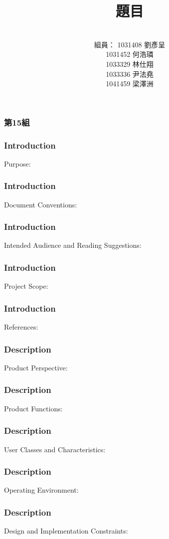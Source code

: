 \documentclass[utf8x]{beamer}
\title[Short title]{\Huge 題目} %
\author{\\  \hspace{-3em}組員： 1031408 劉彥呈 \\ 1031452 何浩璘 \\ 1033329 林仕翔 \\ 1033336 尹法堯 \\ 1041459 梁澤洲} %
\date{} %
\begin{document}
\begin{frame}
\frametitle{\huge 第15組} %
\titlepage %
\end{frame}
\begin{frame}[t]
\frametitle{\huge Introduction} %
\Large Purpose:
\end{frame}

\begin{frame}[t]
\frametitle{\huge Introduction} %
\Large Document Conventions:
\end{frame}

\begin{frame}[t]
\frametitle{\huge Introduction} %
\large Intended Audience and Reading Suggestions:
\end{frame}

\begin{frame}[t]
\frametitle{\huge Introduction} %
\Large Project Scope:
\end{frame}

\begin{frame}[t]
\frametitle{\huge Introduction} %
\Large References:
\end{frame}
\begin{frame}[t]
\frametitle{\huge Description} %
\Large Product Perspective:
\end{frame}

\begin{frame}[t]
\frametitle{\huge Description} %
\Large Product Functions:
\end{frame}

\begin{frame}[t]
\frametitle{\huge Description} %
\Large User Classes and Characteristics:
\end{frame}

\begin{frame}[t]
\frametitle{\huge Description} %
\Large Operating Environment:
\end{frame}

\begin{frame}[t]
\frametitle{\huge Description} %
\Large Design and Implementation Constraints:
\end{frame}
\end{document}
